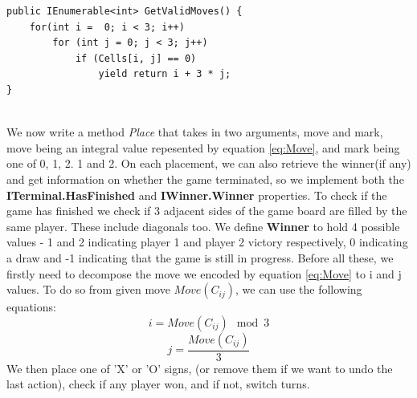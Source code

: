 \begin{lstlisting}
public IEnumerable<int> GetValidMoves() {
    for(int i =  0; i < 3; i++)
        for (int j = 0; j < 3; j++)
            if (Cells[i, j] == 0)
                yield return i + 3 * j;
}
\end{lstlisting}
\\
We now write a method \textit{Place} that takes in two arguments, move and mark, move being an integral value repesented by equation \ref{eq:Move}, and mark being one of 0, 1, 2. 1 and 2.
On each placement, we can also retrieve the winner(if any) and get information on whether the game terminated, so we implement both the \textbf{ITerminal.HasFinished} and \textbf{IWinner.Winner} properties. To check if the game has finished we check if 3 adjacent sides of the game board are filled by the same player. These include diagonals too.
We define \textbf{Winner} to hold 4 possible values - 1 and 2 indicating player 1 and player 2 victory respectively, 0 indicating a draw and -1 indicating that the game is still in progress.
Before all these, we firstly need to decompose the move we encoded by equation \ref{eq:Move} to i and j values. To do so from given move $Move(C_{ij})$, we can use the following equations:
\begin{equation}
    i = Move(C_{ij}) \mod 3
\end{equation}
\begin{equation}
    j = \frac{Move(C_{ij})}{3}
\end{equation}
We then place one of 'X' or 'O' signs, (or remove them if we want to undo the last action), check if any player won, and if not, switch turns.


